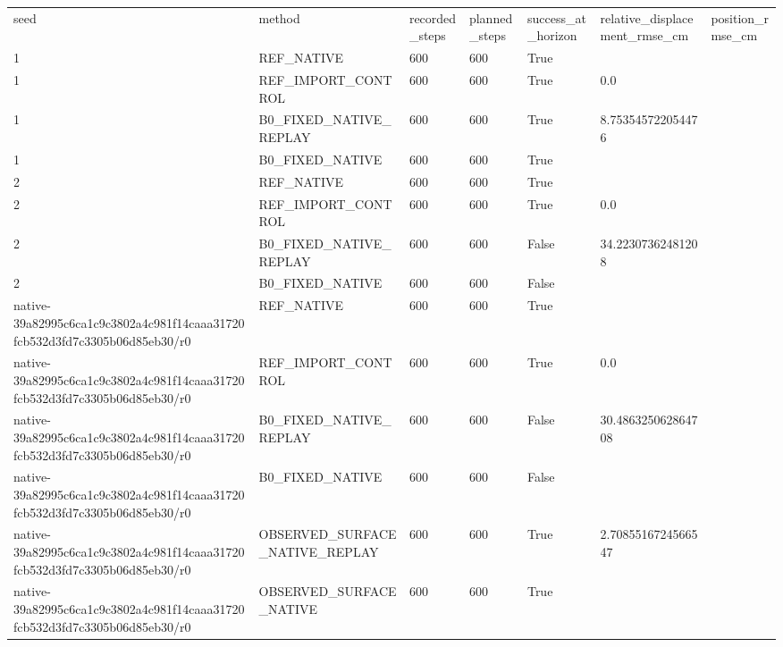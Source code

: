 \begin{tabular}{lllllll}
seed & method & recorded\_steps & planned\_steps & success\_at\_horizon & relative\_displacement\_rmse\_cm & position\_rmse\_cm \\
1 & REF\_NATIVE & 600 & 600 & True &  &  \\
1 & REF\_IMPORT\_CONTROL & 600 & 600 & True & 0.0 &  \\
1 & B0\_FIXED\_NATIVE\_REPLAY & 600 & 600 & True & 8.753545722054476 &  \\
1 & B0\_FIXED\_NATIVE & 600 & 600 & True &  &  \\
2 & REF\_NATIVE & 600 & 600 & True &  &  \\
2 & REF\_IMPORT\_CONTROL & 600 & 600 & True & 0.0 &  \\
2 & B0\_FIXED\_NATIVE\_REPLAY & 600 & 600 & False & 34.22307362481208 &  \\
2 & B0\_FIXED\_NATIVE & 600 & 600 & False &  &  \\
native-39a82995c6ca1c9c3802a4c981f14caaa31720fcb532d3fd7c3305b06d85eb30/r0 & REF\_NATIVE & 600 & 600 & True &  &  \\
native-39a82995c6ca1c9c3802a4c981f14caaa31720fcb532d3fd7c3305b06d85eb30/r0 & REF\_IMPORT\_CONTROL & 600 & 600 & True & 0.0 &  \\
native-39a82995c6ca1c9c3802a4c981f14caaa31720fcb532d3fd7c3305b06d85eb30/r0 & B0\_FIXED\_NATIVE\_REPLAY & 600 & 600 & False & 30.486325062864708 &  \\
native-39a82995c6ca1c9c3802a4c981f14caaa31720fcb532d3fd7c3305b06d85eb30/r0 & B0\_FIXED\_NATIVE & 600 & 600 & False &  &  \\
native-39a82995c6ca1c9c3802a4c981f14caaa31720fcb532d3fd7c3305b06d85eb30/r0 & OBSERVED\_SURFACE\_NATIVE\_REPLAY & 600 & 600 & True & 2.7085516724566547 &  \\
native-39a82995c6ca1c9c3802a4c981f14caaa31720fcb532d3fd7c3305b06d85eb30/r0 & OBSERVED\_SURFACE\_NATIVE & 600 & 600 & True &  &  \\
\end{tabular}
